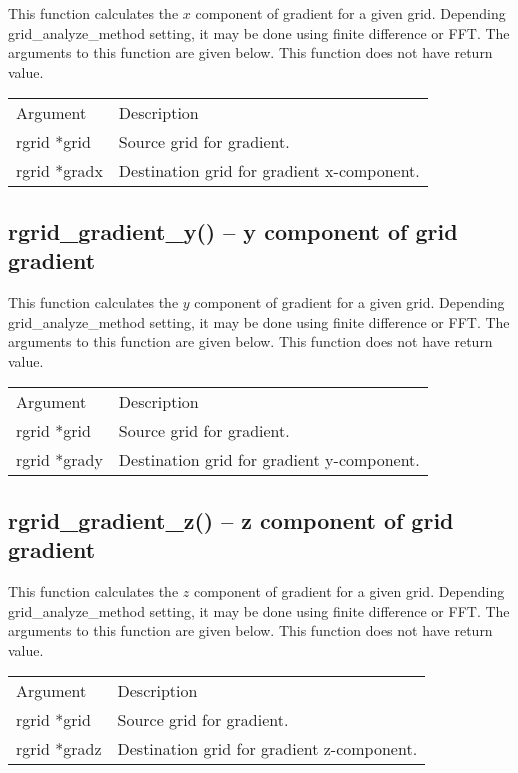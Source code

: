 \documentclass[12pt,letterpaper]{report}
\begin{document}
This function calculates the $x$ component of gradient for a given grid. Depending grid\_analyze\_method setting, it may be done using finite difference or FFT. The arguments to this function are given below. This function does not have return value.\\
\begin{longtable}{p{} p{}}
Argument & Description\\
\cline{1-2}
rgrid *grid & Source grid for gradient.\\
rgrid *gradx & Destination grid for gradient x-component.\\
\end{longtable}

\subsection{rgrid\_gradient\_y() -- y component of grid gradient}

This function calculates the $y$ component of gradient for a given grid. Depending grid\_analyze\_method setting, it may be done using finite difference or FFT. The arguments to this function are given below. This function does not have return value.\\
\begin{longtable}{p{} p{}}
Argument & Description\\
\cline{1-2}
rgrid *grid & Source grid for gradient.\\
rgrid *grady & Destination grid for gradient y-component.\\
\end{longtable}

\subsection{rgrid\_gradient\_z() -- z component of grid gradient}

This function calculates the $z$ component of gradient for a given grid. Depending grid\_analyze\_method setting, it may be done using finite difference or FFT. The arguments to this function are given below. This function does not have return value.\\
\begin{longtable}{p{} p{}}
Argument & Description\\
\cline{1-2}
rgrid *grid & Source grid for gradient.\\
rgrid *gradz & Destination grid for gradient z-component.\\
\end{longtable}
\end{document}
